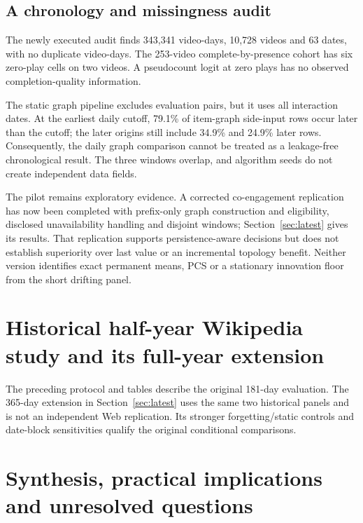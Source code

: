 \subsection{A chronology and missingness audit}
The newly executed audit finds 343,341 video-days, 10,728 videos and 63 dates, with no duplicate video-days. The 253-video complete-by-presence cohort has six zero-play cells on two videos. A pseudocount logit at zero plays has no observed completion-quality information.

The static graph pipeline excludes evaluation pairs, but it uses all interaction dates. At the earliest daily cutoff, 79.1\% of item-graph side-input rows occur later than the cutoff; the later origins still include 34.9\% and 24.9\% later rows. Consequently, the daily graph comparison cannot be treated as a leakage-free chronological result. The three windows overlap, and algorithm seeds do not create independent data fields.

The pilot remains exploratory evidence. A corrected co-engagement replication has now been completed with prefix-only graph construction and eligibility, disclosed unavailability handling and disjoint windows; Section~\ref{sec:latest} gives its results. That replication supports persistence-aware decisions but does not establish superiority over last value or an incremental topology benefit. Neither version identifies exact permanent means, PCS or a stationary innovation floor from the short drifting panel.

\section{Historical half-year Wikipedia study and its full-year extension}
\label{sec:wiki}



The preceding protocol and tables describe the original 181-day evaluation. The 365-day extension in Section~\ref{sec:latest} uses the same two historical panels and is not an independent Web replication. Its stronger forgetting/static controls and date-block sensitivities qualify the original conditional comparisons.

\clearpage

\clearpage

\section{Synthesis, practical implications and unresolved questions}

